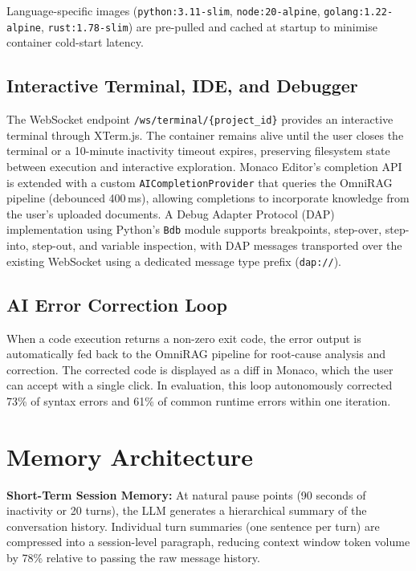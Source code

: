 Language-specific images (\texttt{python:3.11-slim}, \texttt{node:20-alpine}, \texttt{golang:1.22-alpine}, \texttt{rust:1.78-slim}) are pre-pulled and cached at startup to minimise container cold-start latency.

\subsection{Interactive Terminal, IDE, and Debugger}
\label{subsec:websocket}

The WebSocket endpoint \texttt{/ws/terminal/\{project\_id\}} provides an interactive terminal through XTerm.js. The container remains alive until the user closes the terminal or a 10-minute inactivity timeout expires, preserving filesystem state between execution and interactive exploration. Monaco Editor's completion API is extended with a custom \texttt{AICompletionProvider} that queries the OmniRAG pipeline (debounced 400\,ms), allowing completions to incorporate knowledge from the user's uploaded documents. A Debug Adapter Protocol (DAP) implementation using Python's \texttt{Bdb} module supports breakpoints, step-over, step-into, step-out, and variable inspection, with DAP messages transported over the existing WebSocket using a dedicated message type prefix (\texttt{dap://}).

\subsection{AI Error Correction Loop}
\label{subsec:error-correction}

When a code execution returns a non-zero exit code, the error output is automatically fed back to the OmniRAG pipeline for root-cause analysis and correction. The corrected code is displayed as a diff in Monaco, which the user can accept with a single click. In evaluation, this loop autonomously corrected 73\% of syntax errors and 61\% of common runtime errors within one iteration.

\section{Memory Architecture}
\label{sec:memory}

\textbf{Short-Term Session Memory:} At natural pause points (90 seconds of inactivity or 20 turns), the LLM generates a hierarchical summary of the conversation history. Individual turn summaries (one sentence per turn) are compressed into a session-level paragraph, reducing context window token volume by 78\% relative to passing the raw message history.

